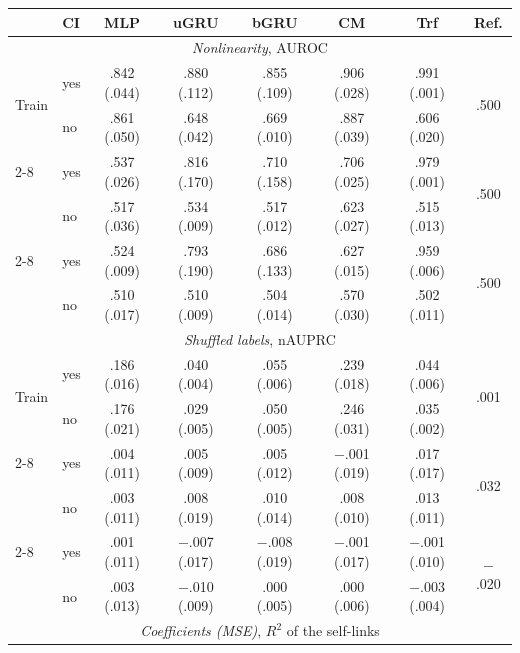 \begin{table}[ht]
    \centering
    \small
    \setlength{\tabcolsep}{3.5pt}
    \begin{tabular}{llccccc|c}
    \toprule
        ~ & CI & \textbf{MLP} & \textbf{uGRU} & \textbf{bGRU} & \textbf{CM} & \textbf{Trf} & \textbf{Ref.} \\
    \midrule
        \multicolumn{8}{c}{\textit{Nonlinearity}, AUROC} \\
    \midrule
        \multirow{2}{*}{Train} & yes & .842 (.044) & .880 (.112) & .855 (.109) & .906 (.028) & .991 (.001) & \multirow{2}{*}{.500} \\
        ~ & no & .861 (.050) & .648 (.042) & .669 (.010) & .887 (.039) & .606 (.020) & ~ \\
    \cmidrule{2-8}
        \multirow{2}{*}{In-dist.} & yes & .537 (.026) & .816 (.170) & .710 (.158) & .706 (.025) & .979 (.001) & \multirow{2}{*}{.500} \\
        ~ & no & .517 (.036) & .534 (.009) & .517 (.012) & .623 (.027) & .515 (.013) & ~ \\
    \cmidrule{2-8}
        \multirow{2}{*}{Shifted} & yes & .524 (.009) & .793 (.190) & .686 (.133) & .627 (.015) & .959 (.006) & \multirow{2}{*}{.500} \\
        ~ & no & .510 (.017) & .510 (.009) & .504 (.014) & .570 (.030) & .502 (.011) & ~ \\
    \midrule
        \multicolumn{8}{c}{\textit{Shuffled labels}, nAUPRC} \\
    \midrule
        \multirow{2}{*}{Train} & yes & .186 (.016) & .040 (.004) & .055 (.006) & .239 (.018) & .044 (.006) & \multirow{2}{*}{.001} \\
        ~ & no & .176 (.021) & .029 (.005) & .050 (.005) & .246 (.031) & .035 (.002) & ~ \\
    \cmidrule{2-8}
        \multirow{2}{*}{In-dist.} & yes & .004 (.011) & .005 (.009) & .005 (.012) & $-$.001 (.019) & .017 (.017) & \multirow{2}{*}{.032} \\
        ~ & no & .003 (.011) & .008 (.019) & .010 (.014) & .008 (.010) & .013 (.011) & ~ \\
    \cmidrule{2-8}
        \multirow{2}{*}{Shifted} & yes & .001 (.011) & $-$.007 (.017) & $-$.008 (.019) & $-$.001 (.017) & $-$.001 (.010) & \multirow{2}{*}{$-$.020} \\
        ~ & no & .003 (.013) & $-$.010 (.009) & .000 (.005) & .000 (.006) & $-$.003 (.004) & ~ \\
    \midrule
        \multicolumn{8}{c}{\textit{Coefficients (MSE)}, $R^2$ of the self-links} \\

\end{tabular}
\end{table}
